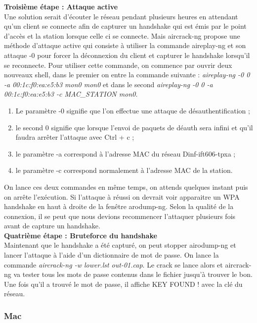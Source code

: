 \documentclass[11pt]{article}
\begin{document}
\textbf{Troisième étape : Attaque active}~\\
Une solution serait d'écouter le réseau pendant plusieurs heures en attendant qu'un client se connecte afin de capturer un handshake qui est émis par le point d'accès et la station lorsque celle ci se connecte. Mais aircrack-ng propose une méthode d'attaque active qui consiste à utiliser la commande aireplay-ng et son attaque -0 pour forcer la déconnexion du client et capturer le handshake lorsqu'il se reconnecte. Pour utiliser cette commande, on commence par ouvrir deux nouveaux shell, dans le premier on entre la commande suivante : \textit{aireplay-ng -0 0 -a 00:1c:f0:ea:e5:b3 mon0 mon0} et dans le second \textit{aireplay-ng -0 0 -a 00:1c:f0:ea:e5:b3 -c MAC\_STATION mon0}. ~\\
\begin{enumerate}
\item Le paramètre -0 signifie que l'on effectue une attaque de désauthentification ;
\item le second 0 signifie que lorsque l'envoi de paquets de déauth sera infini et qu'il faudra arrêter l'attaque avec Ctrl + c ;
\item le paramètre -a correspond à l'adresse MAC du réseau Dinf-ift606-tpxa ;
\item le paramètre -c correspond normalement à l'adresse MAC de la station.
\end{enumerate} 
On lance ces deux commandes en même temps, on attends quelques instant puis on arrête l'exécution.
Si l'attaque à réussi on devrait voir apparaitre un WPA handshake en haut à droite de la fenêtre arodump-ng. Selon la qualité de la connexion, il se peut que nous devions recommencer l'attaquer plusieurs fois avant de capture un handshake.~\\

\textbf{Quatrième étape : Bruteforce du handshake}~\\
Maintenant que le handshake a été capturé, on peut stopper airodump-ng et lancer l'attaque à l'aide d'un dictionnaire de mot de passe. On lance la commande \textit{aircrack-ng -w lower.lst out-01.cap}. 
Le crack se lance alors et aircrack-ng va tester tous les mots de passe contenus dans le fichier jusqu'à trouver le bon. 
Une fois qu'il a trouvé le mot de passe, il affiche KEY FOUND ! avec la clé du réseau.~\\


\subsubsection{Mac}
\end{document}
